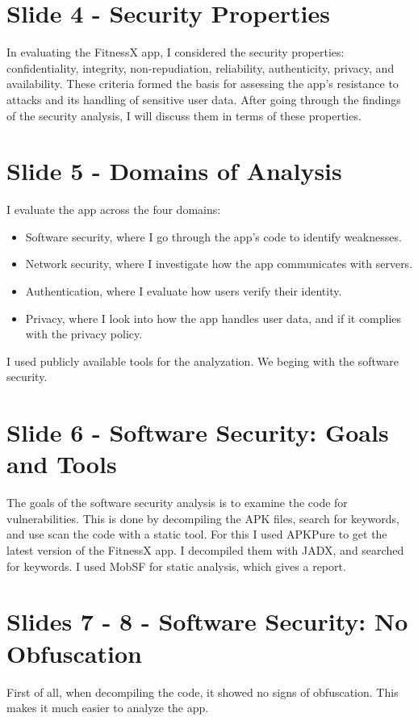 \documentclass[12pt,a4paper]{article}
\begin{document}
\section*{Slide 4 - Security Properties}
In evaluating the FitnessX app, I considered the security properties: confidentiality, integrity, non-repudiation, reliability, authenticity, privacy, and availability. These criteria formed the basis for assessing the app's resistance to attacks and its handling of sensitive user data. After going through the findings of the security analysis, I will discuss them in terms of these properties.

\section*{Slide 5 - Domains of Analysis}
I evaluate the app across the four domains: 

\begin{itemize}
    \item Software security, where I go through the app's code to identify weaknesses.
    \item Network security, where I investigate how the app communicates with servers. 
    \item Authentication, where I evaluate how users verify their identity.
    \item  Privacy, where I look into how the app handles user data, and if it complies with the privacy policy.
\end{itemize}

I used publicly available tools for the analyzation. We beging with the software security.


\section*{Slide 6 - Software Security: Goals and Tools}
The goals of the software security analysis is to examine the code for vulnerabilities. This is done by decompiling the APK files, search for keywords, and use scan the code with a static tool. For this I used APKPure to get the latest version of the FitnessX app. I decompiled them with JADX, and searched for keywords. I used MobSF for static analysis, which gives a report.

\section*{Slides 7 - 8 - Software Security: No Obfuscation}
First of all, when decompiling the code, it showed no signs of obfuscation. This makes it much easier to analyze the app. 
\end{document}
